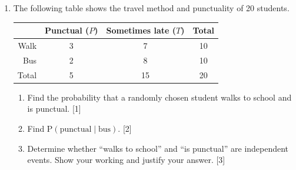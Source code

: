 \documentclass[12pt, twoside]{article}
\begin{document}
\begin{enumerate}[itemsep=0.15cm]

\newpage
\item The following table shows the travel method and punctuality of 20 students.

\renewcommand{\arraystretch}{1.6}
\begin{center}
\begin{tabular}{|r|c|c|c|}
    \hline
    & Punctual ($P$) & Sometimes late ($T$) & Total \\
    \hline
    Walk    & 3  & 7 & 10 \\
    \hline
    Bus     & 2  & 8  & 10  \\
    \hline
    Total   & 5  & 15 & 20 \\
    \hline
\end{tabular}
\end{center}

\begin{enumerate}[itemsep=0.0cm]
  \item Find the probability that a randomly chosen student walks to school
        and is punctual. \hfill [1]
  \item Find $\mathrm{P}(\text{punctual} \mid \text{bus})$. \hfill [2]
  \item Determine whether ``walks to school'' and ``is punctual'' are independent events.
        Show your working and justify your answer. \hfill [3]
\end{enumerate}



\end{enumerate}
\end{document}
